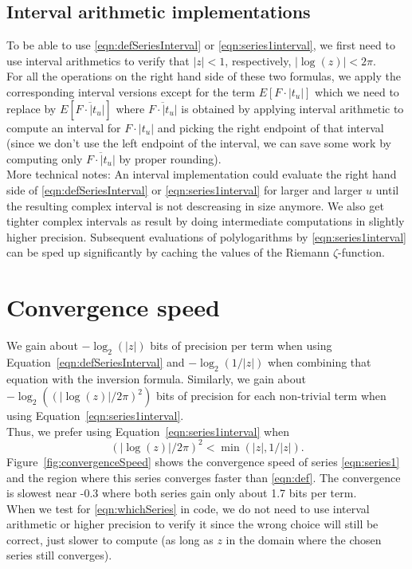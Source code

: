 \documentclass[utopia]{nmd/article}
\begin{document}
\subsection{Interval arithmetic implementations} To be able to use \eqref{eqn:defSeriesInterval} or \eqref{eqn:series1interval}, we first need to use interval arithmetics to verify that $|z|<1$, respectively, $|\log(z)| < 2\pi$.\\
For all the operations on the right hand side of these two formulas, 
we apply the corresponding interval versions except for the term $E[F\cdot |t_u|]$ which we need to replace by $E[\overline{F\cdot |t_u|}]$ where $\overline{F\cdot |t_u|}$ is obtained by applying interval arithmetic to compute an interval for $F\cdot |t_u|$ and picking the right endpoint of that interval (since we don't use the left endpoint of the interval, we can save some work by computing only $\overline{F\cdot |t_u|}$ by proper rounding).\\
More technical notes: An interval implementation could evaluate the right hand side of \eqref{eqn:defSeriesInterval} or \eqref{eqn:series1interval} for larger and larger $u$ until the resulting complex interval is not descreasing in size anymore. We also get tighter complex intervals as result by doing intermediate computations in slightly higher precision. Subsequent evaluations of polylogarithms by \eqref{eqn:series1interval} can be sped up significantly by caching the values of the Riemann $\zeta$-function.

\section{Convergence speed}
We gain about $-\log_2(|z|)$ bits of precision per term when using Equation~\ref{eqn:defSeriesInterval} and $-\log_2(1/|z|)$ when combining that equation with the inversion formula. Similarly, we gain about $-\log_2((|\log(z)|/2\pi)^2)$ bits of precision for each non-trivial term when using Equation~\ref{eqn:series1interval}.\\
Thus, we prefer using Equation~\ref{eqn:series1interval} when
\begin{equation} \label{eqn:whichSeries}
(|\log(z)| / 2\pi)^2 < \min(|z|, 1/|z|).
\end{equation}
Figure~\ref{fig:convergenceSpeed} shows the convergence speed of series \eqref{eqn:series1} and the region where this series converges faster than \eqref{eqn:def}. The convergence is slowest near -0.3 where both series gain only about 1.7 bits per term.\\
When we test for \eqref{eqn:whichSeries} in code, we do not need to use interval arithmetic or higher precision to verify it since the wrong choice will still be correct, just slower to compute (as long as $z$ in the domain where the chosen series still converges).\\
\end{document}

